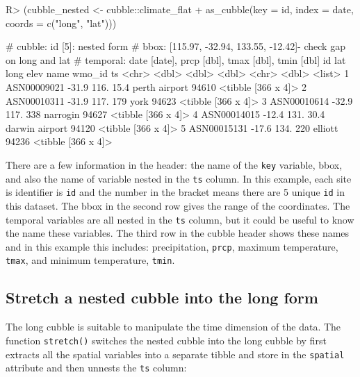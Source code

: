 \documentclass[
]{jss}
\begin{document}
\begin{CodeChunk}
\begin{CodeInput}
R> (cubble_nested <- cubble::climate_flat %
+   as_cubble(key = id, index = date, coords = c("long", "lat")))
\end{CodeInput}
\begin{CodeOutput}
# cubble:   id [5]: nested form
# bbox:     [115.97, -32.94, 133.55, -12.42]- check gap on long and lat
# temporal: date [date], prcp [dbl], tmax [dbl], tmin [dbl]
  id            lat  long  elev name           wmo_id ts                
  <chr>       <dbl> <dbl> <dbl> <chr>           <dbl> <list>            
1 ASN00009021 -31.9  116.  15.4 perth airport   94610 <tibble [366 x 4]>
2 ASN00010311 -31.9  117. 179   york            94623 <tibble [366 x 4]>
3 ASN00010614 -32.9  117. 338   narrogin        94627 <tibble [366 x 4]>
4 ASN00014015 -12.4  131.  30.4 darwin airport  94120 <tibble [366 x 4]>
5 ASN00015131 -17.6  134. 220   elliott         94236 <tibble [366 x 4]>
\end{CodeOutput}
\end{CodeChunk}

There are a few information in the  header: the name of the
\texttt{key} variable, bbox, and also the name of variable nested in the
\texttt{ts} column. In this example, each site is identifier is
\texttt{id} and the number in the bracket means there are 5 unique
\texttt{id} in this dataset. The bbox in the second row gives the range
of the coordinates. The temporal variables are all nested in the
\texttt{ts} column, but it could be useful to know the name these
variables. The third row in the cubble header shows these names and in
this example this includes: precipitation, \texttt{prcp}, maximum
temperature, \texttt{tmax}, and minimum temperature, \texttt{tmin}.

\hypertarget{stretch-a-nested-cubble-into-the-long-form}{%
\subsection{Stretch a nested cubble into the long
form}\label{stretch-a-nested-cubble-into-the-long-form}}

The long cubble is suitable to manipulate the time dimension of the
data. The function \texttt{stretch()} switches the nested cubble into
the long cubble by first extracts all the spatial variables into a
separate tibble and store in the \texttt{spatial} attribute and then
unnests the \texttt{ts} column:
\end{document}
